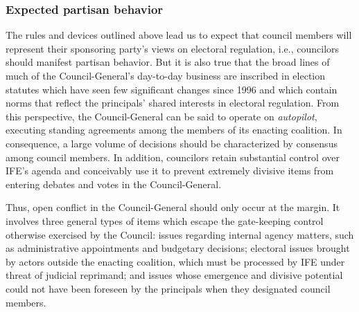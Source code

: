 \documentclass[12 pt, letter]{article}
\begin{document}
\subsubsection{Expected partisan behavior}
The rules and devices outlined above lead us to expect that council members will represent their sponsoring party's views on electoral regulation, i.e., councilors should manifest partisan behavior.  But it is also true that the broad lines of much of the Council-General's day-to-day business are inscribed in election statutes which have seen few significant changes since 1996 and which contain norms that reflect the principals' shared interests in electoral regulation.  From this perspective, the Council-General can be said to operate on \emph{autopilot}, executing standing agreements among the members of its enacting coalition.  In consequence, a large volume of decisions should be characterized by consensus among council members.  In addition, councilors retain substantial control over IFE's agenda and conceivably use it to prevent extremely divisive items from entering debates and votes in the Council-General.

Thus, open conflict in the Council-General should only occur at the margin.  It involves three general types of items which escape the gate-keeping control otherwise exercised by the Council: issues regarding internal agency matters, such as administrative appointments and budgetary decisions; electoral issues brought by actors outside the enacting coalition, which must be processed by IFE under threat of judicial reprimand; and issues whose emergence and divisive potential could not have been foreseen by the principals when they designated council members.
\end{document}
